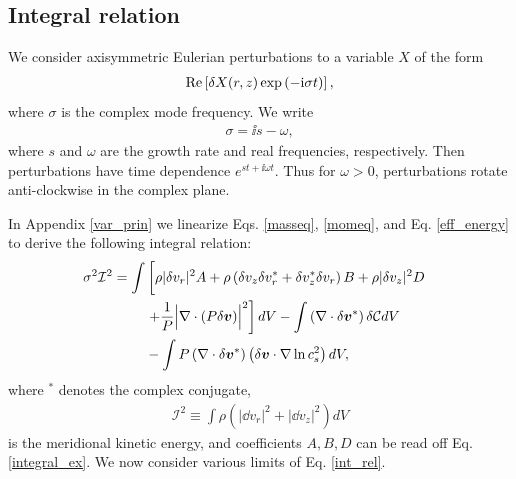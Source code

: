 


\subsection{Integral relation}

We consider axisymmetric Eulerian perturbations to a variable $X$ of
the form  
\begin{align}
 \operatorname{Re}\left[ \delta X(r,z)\exp{\left(-\mathrm{i}\sigma t\right)}\right], 
\end{align}
where $\sigma$ is the complex mode frequency. We 
write 
\begin{align}
  \sigma = \ii s - \omega,
\end{align}
where $s$ and $\omega$ are the growth rate and real frequencies,
respectively. Then perturbations have time dependence $e^{st +
  \ii\omega t}$.  Thus for $\omega>0$, perturbations rotate
anti-clockwise in the complex plane. 

In Appendix \ref{var_prin} we linearize Eqs. \ref{masseq}, \ref{momeq}, and 
Eq. \ref{eff_energy} to derive the following integral relation: 
\begin{align}
  \sigma^2\mathcal{I}^2
&= \int\left[ \rho
  |\dd v_r|^2A + \rho  \left(\dd v_z \dd v_r^* + \dd v_z^*\dd v_r\right) B +
  \rho |\dd v_z|^2 D\phantom{\frac{1}{1}}\right. \notag\\
&\phantom{===}  \left. + \frac{1}{P}\Bigl\lvert \nabla\cdot\left(P\dd
  \bm{v}\right)\Bigr\rvert^2\right]dV  -\int \left(\nabla\cdot\dd\bm{v}^*\right)\dd\mathcal{C}dV \notag\\
&\phantom{===}
- \int P
  \left(\nabla\cdot\dd\bm{v}^*\right)\left(\dd\bm{v}\cdot\nabla\ln{c_s^2}\right)dV,\label{int_rel}
\end{align} 
where $^*$ denotes the complex conjugate, 
\begin{align}
  \mathcal{I}^2 \equiv \int\rho\left(|\dd v_r|^2 + |\dd v_z|^2\right)dV
\end{align}
is the meridional kinetic energy, 
and coefficients $A,B,D$ can be 
read off Eq. \ref{integral_ex}. %
We now consider various limits of Eq. \ref{int_rel}.    


